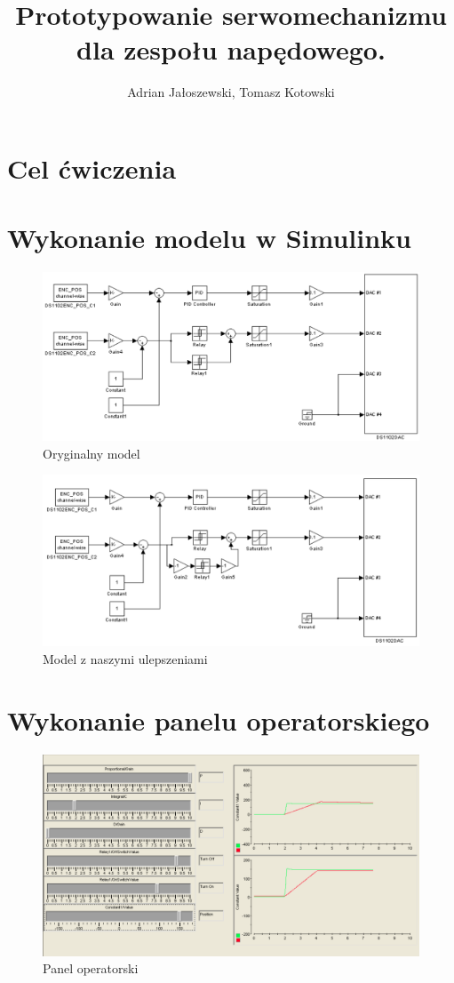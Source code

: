 \documentclass[a4paper, 12pt, titlepage]{article}
\title{Prototypowanie serwomechanizmu dla zespołu napędowego.}
\author{Adrian Jałoszewski, Tomasz Kotowski}
\date{}
\begin{document}
	\maketitle
	\section{Cel ćwiczenia}
	\section{Wykonanie modelu w Simulinku}
		\begin{figure}[H]
			\includegraphics[width=\textwidth]{img/original_system.png}
			\caption{Oryginalny model}
		\end{figure}
		\begin{figure}[H]
			\includegraphics[width=\textwidth]{img/our_improved_system.png}
			\caption{Model z naszymi ulepszeniami}
		\end{figure}
	\section{Wykonanie panelu operatorskiego}
		\begin{figure}[H]
			\includegraphics[width=\textwidth]{img/operational_panel.png}
			\caption{Panel operatorski}
		\end{figure}
\end{document}
